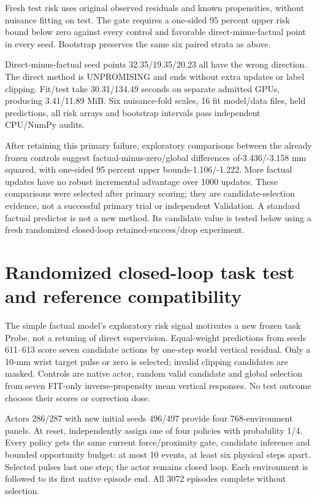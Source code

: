 \documentclass[10pt]{article}
\begin{document}
Fresh test risk uses original observed residuals and known propensities, without
nuisance fitting on test. The gate requires a one-sided 95 percent upper risk bound
below zero against every control and favorable direct-minus-factual point in every
seed. Bootstrap preserves the same six paired strata as above.

\begin{table}[h]
\centering

\caption{Direct randomized learner minus each frozen control, mm squared; every fixed gate fails.}
\end{table}

Direct-minus-factual seed points 32.35/19.35/20.23 all have the wrong direction.
The direct method is UNPROMISING and ends without extra updates or label clipping.
Fit/test take 30.31/134.49 seconds on separate admitted GPUs, producing 3.41/11.89 MiB.
Six nuisance-fold scales, 16 fit model/data files, held predictions, all risk arrays
and bootstrap intervals pass independent CPU/NumPy audits.

After retaining this primary failure, exploratory comparisons between the already
frozen controls suggest factual-minus-zero/global differences of-3.436/-3.158 mm
squared, with one-sided 95 percent upper bounds-1.106/-1.222. More factual updates
have no robust incremental advantage over 1000 updates. These comparisons were
selected after primary scoring; they are candidate-selection evidence, not a
successful primary trial or independent Validation. A standard factual predictor
is not a new method. Its candidate value is tested below using a fresh randomized
closed-loop retained-success/drop experiment.

\section{Randomized closed-loop task test and reference compatibility}
The simple factual model's exploratory risk signal motivates a new frozen task
Probe, not a retuning of direct supervision. Equal-weight predictions from
seeds 611--613 score seven candidate actions by one-step world vertical residual.
Only a 10-mm wrist target pulse or zero is selected; invalid clipping candidates
are masked. Controls are native actor, random valid candidate and global selection
from seven FIT-only inverse-propensity mean vertical responses. No test outcome
chooses their scores or correction dose.

Actors 286/287 with new initial seeds 496/497 provide four 768-environment panels.
At reset, independently assign one of four policies with probability 1/4. Every
policy gets the same current force/proximity gate, candidate inference and bounded
opportunity budget: at most 10 events, at least six physical steps apart. Selected
pulses last one step; the actor remains closed loop. Each environment is followed
to its first native episode end. All 3072 episodes complete without selection.
\end{document}
